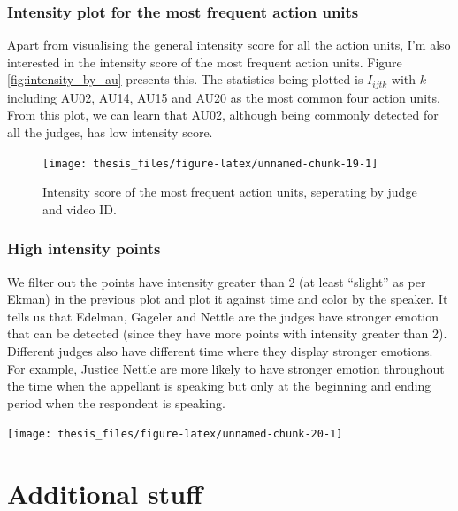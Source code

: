 \documentclass{monashthesis}
\begin{document}
\hypertarget{intensity-plot-for-the-most-frequent-action-units}{%
\subsection{Intensity plot for the most frequent action units}\label{intensity-plot-for-the-most-frequent-action-units}}

Apart from visualising the general intensity score for all the action units, I'm also interested in the intensity score of the most frequent action units. Figure \ref{fig:intensity_by_au} presents this. The statistics being plotted is \(I_{ijtk}\) with \(k\) including AU02, AU14, AU15 and AU20 as the most common four action units. From this plot, we can learn that AU02, although being commonly detected for all the judges, has low intensity score.

\begin{figure}
\texttt{[image: thesis\_files/figure-latex/unnamed-chunk-19-1]} \caption{Intensity score of the most frequent action units, seperating by judge and video ID.\label{fig:intensity_by_au}}\label{fig:unnamed-chunk-19}
\end{figure}

\hypertarget{high-intensity-points}{%
\subsection{High intensity points}\label{high-intensity-points}}

We filter out the points have intensity greater than 2 (at least ``slight'' as per Ekman) in the previous plot and plot it against time and color by the speaker. It tells us that Edelman, Gageler and Nettle are the judges have stronger emotion that can be detected (since they have more points with intensity greater than 2). Different judges also have different time where they display stronger emotions. For example, Justice Nettle are more likely to have stronger emotion throughout the time when the appellant is speaking but only at the beginning and ending period when the respondent is speaking.

\texttt{[image: thesis\_files/figure-latex/unnamed-chunk-20-1]}

\appendix

\hypertarget{additional-stuff}{%
\chapter{Additional stuff}\label{additional-stuff}}
\end{document}
